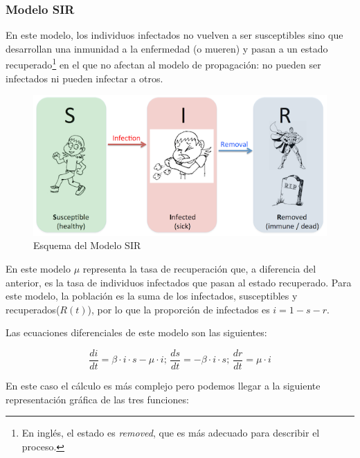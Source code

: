 \documentclass[]{article}
\begin{document}
\subsubsection{Modelo SIR}\label{modelo-sir}

En este modelo, los individuos infectados no vuelven a ser susceptibles
sino que desarrollan una inmunidad a la enfermedad (o mueren) y pasan a
un estado recuperado\footnote{En inglés, el estado es \emph{removed},
  que es más adecuado para describir el proceso.} en el que no afectan
al modelo de propagación: no pueden ser infectados ni pueden infectar a
otros.

\begin{figure}[htbp]
\centering
\includegraphics{../images/tema08/modeloSIR.png}
\caption{Esquema del Modelo SIR}
\end{figure}

En este modelo \(\mu\) representa la tasa de recuperación que, a
diferencia del anterior, es la tasa de individuos infectados que pasan
al estado recuperado. Para este modelo, la población es la suma de los
infectados, susceptibles y recuperados(\(R(t)\)), por lo que la
proporción de infectados es \(i = 1-s-r\).

Las ecuaciones diferenciales de este modelo son las siguientes:

\[\frac{di}{dt} = \beta \cdot i \cdot s - \mu \cdot i \text{;  }\frac{ds}{dt} = -\beta \cdot i \cdot s\text{;  }\frac{dr}{dt} = \mu \cdot i\]

En este caso el cálculo es más complejo pero podemos llegar a la
siguiente representación gráfica de las tres funciones:
\end{document}
